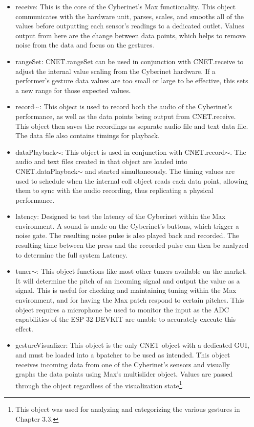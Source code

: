 \begin{itemize}
    \item receive: This is the core of the Cyberinet's Max functionality. This object communicates with the hardware unit, parses, scales, and smooths all of the values before outputting each sensor's readings to a dedicated outlet. Values output from here are the change between data points, which helps to remove noise from the data and focus on the gestures.
    \item rangeSet: CNET.rangeSet can be used in conjunction with CNET.receive to adjust the internal value scaling from the Cyberinet hardware. If a performer's gesture data values are too small or large to be effective, this sets a new range for those expected values.
    \item record$\sim$: This object is used to record both the audio of the Cyberinet's performance, as well as the data points being output from CNET.receive. This object then saves the recordings as separate audio file and text data file. The data file also contains timings for playback.
    \item dataPlayback$\sim$: This object is used in conjunction with CNET.record$\sim$. The audio and text files created in that object are loaded into CNET.dataPlayback$\sim$ and started simultaneously. The timing values are used to schedule when the internal coll object reads each data point, allowing them to sync with the audio recording, thus replicating a physical performance.
    \item latency: Designed to test the latency of the Cyberinet within the Max environment. A sound is made on the Cyberinet's buttons, which trigger a noise gate. The resulting noise pulse is also played back and recorded. The resulting time between the press and the recorded pulse can then be analyzed to determine the full system Latency.
    \item  tuner$\sim$: This object functions like most other tuners available on the market. It will determine the pitch of an incoming signal and output the value as a signal. This is useful for checking and maintaining tuning within the Max environment, and for having the Max patch respond to certain pitches. This object requires a microphone be used to monitor the input as the ADC capabilities of the ESP-32 DEVKIT are unable to accurately execute this effect.
    \item gestureVisualizer: This object is the only CNET object with a dedicated GUI, and must be loaded into a bpatcher to be used as intended. This object receives incoming data from one of the Cyberinet's sensors and visually graphs the data points using Max's multislider object. Values are passed through the object regardless of the visualization state\footnote{This object was used for analyzing and categorizing the various gestures in Chapter 3.3.}.

\end{itemize}
